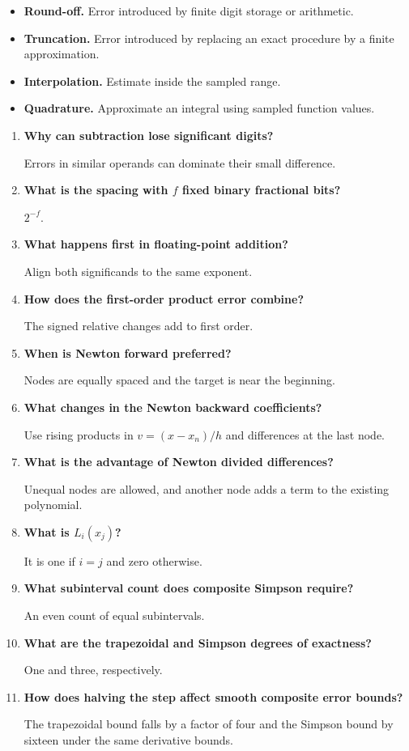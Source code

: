 \documentclass[12pt,a4paper]{article}
\newcommand{\Q}[1]{\textbf{#1}\par\noindent\ignorespaces}
\begin{document}
\begin{tcolorbox}[defbox, title={One-Line Definitions}]
\begin{itemize}[leftmargin=*, itemsep=3pt, topsep=4pt]
  \item \textbf{Round-off.} Error introduced by finite digit storage or arithmetic.
  \item \textbf{Truncation.} Error introduced by replacing an exact procedure by a finite approximation.
  \item \textbf{Interpolation.} Estimate inside the sampled range.
  \item \textbf{Quadrature.} Approximate an integral using sampled function values.
\end{itemize}
\end{tcolorbox}

\begin{tcolorbox}[exambox, title={Frequently Asked / Viva Questions}]
\begin{enumerate}[topsep=0pt, label=\textbf{Q\arabic*.}, itemsep=5pt, leftmargin=*]
  \item \Q{Why can subtraction lose significant digits?}
    Errors in similar operands can dominate their small difference.
  \item \Q{What is the spacing with $f$ fixed binary fractional bits?}
    $2^{-f}$.
  \item \Q{What happens first in floating-point addition?}
    Align both significands to the same exponent.
  \item \Q{How does the first-order product error combine?}
    The signed relative changes add to first order.
  \item \Q{When is Newton forward preferred?}
    Nodes are equally spaced and the target is near the beginning.
  \item \Q{What changes in the Newton backward coefficients?}
    Use rising products in $v=(x-x_n)/h$ and differences at the last node.
  \item \Q{What is the advantage of Newton divided differences?}
    Unequal nodes are allowed, and another node adds a term to the existing polynomial.
  \item \Q{What is $L_i(x_j)$?}
    It is one if $i=j$ and zero otherwise.
  \item \Q{What subinterval count does composite Simpson require?}
    An even count of equal subintervals.
  \item \Q{What are the trapezoidal and Simpson degrees of exactness?}
    One and three, respectively.
  \item \Q{How does halving the step affect smooth composite error bounds?}
    The trapezoidal bound falls by a factor of four and the Simpson bound by sixteen under the same derivative bounds.
\end{enumerate}
\end{tcolorbox}
\end{document}
